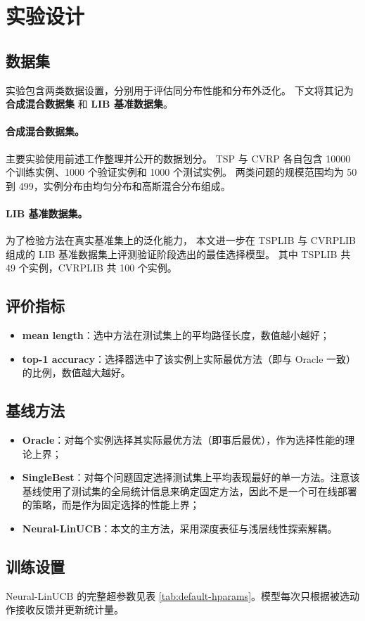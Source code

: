 
\section{实验设计}
\label{sec:experiment}

\subsection{数据集}

实验包含两类数据设置，分别用于评估同分布性能和分布外泛化。
下文将其记为 \textbf{合成混合数据集} 和 \textbf{LIB 基准数据集}。

\paragraph{合成混合数据集。}
主要实验使用前述工作整理并公开的数据划分。
TSP 与 CVRP 各自包含 10000 个训练实例、1000 个验证实例和 1000 个测试实例\cite{gao2025nss}。
两类问题的规模范围均为 50 到 499，实例分布由均匀分布和高斯混合分布组成。

\paragraph{LIB 基准数据集。}
为了检验方法在真实基准集上的泛化能力，
本文进一步在 TSPLIB 与 CVRPLIB 组成的 LIB 基准数据集上评测验证阶段选出的最佳选择模型。
其中 TSPLIB\cite{reinelt1991tsplib} 共 49 个实例，CVRPLIB\cite{uchoa2017cvrplib} 共 100 个实例。

\subsection{评价指标}
\begin{itemize}
  \item \textbf{mean length}：选中方法在测试集上的平均路径长度，数值越小越好；
  \item \textbf{top-1 accuracy}：选择器选中了该实例上实际最优方法（即与 Oracle 一致）的比例，数值越大越好。
\end{itemize}

\subsection{基线方法}
\begin{itemize}
  \item \textbf{Oracle}：对每个实例选择其实际最优方法（即事后最优），作为选择性能的理论上界；
  \item \textbf{SingleBest}：对每个问题固定选择测试集上平均表现最好的单一方法。注意该基线使用了测试集的全局统计信息来确定固定方法，因此不是一个可在线部署的策略，而是作为固定选择的性能上界；
  \item \textbf{Neural-LinUCB}：本文的主方法，采用深度表征与浅层线性探索解耦\cite{xu2022neurallinucb}。
\end{itemize}

\subsection{训练设置}

Neural-LinUCB 的完整超参数见表 \ref{tab:default-hparams}。模型每次只根据被选动作接收反馈并更新统计量。
